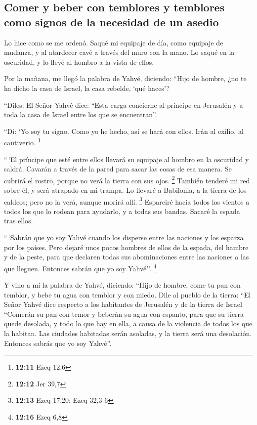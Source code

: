 \begin{paracol}{2}
\hypertarget{comer-y-beber-con-temblores-y-temblores-como-signos-de-la-necesidad-de-un-asedio}{%
\subsection{Comer y beber con temblores y temblores como signos de la
necesidad de un
asedio}\label{comer-y-beber-con-temblores-y-temblores-como-signos-de-la-necesidad-de-un-asedio}}

 Lo hice como se me ordenó. Saqué mi equipaje de día, como
equipaje de mudanza, y al atardecer cavé a través del muro con la mano.
Lo saqué en la oscuridad, y lo llevé al hombro a la vista de ellos.

 Por la mañana, me llegó la palabra de Yahvé, diciendo:
 ``Hijo de hombre, ¿no te ha dicho la casa de Israel, la
casa rebelde, `qué haces'?

 ``Diles: El Señor Yahvé dice: ``Esta carga concierne al
príncipe en Jerusalén y a toda la casa de Israel entre los que se
encuentran''.

 ``Di: `Yo soy tu signo. Como yo he hecho, así se hará
con ellos. Irán al exilio, al cautiverio. \footnote{\textbf{12:11} Ezeq
  12,6}

 ``\,`El príncipe que esté entre ellos llevará su
equipaje al hombro en la oscuridad y saldrá. Cavarán a través de la
pared para sacar las cosas de esa manera. Se cubrirá el rostro, porque
no verá la tierra con sus ojos. \footnote{\textbf{12:12} Jer 39,7}
 También tenderé mi red sobre él, y será atrapado en mi
trampa. Lo llevaré a Babilonia, a la tierra de los caldeos; pero no la
verá, aunque morirá allí. \footnote{\textbf{12:13} Ezeq 17,20; Ezeq
  32,3-6}  Esparciré hacia todos los vientos a todos los
que lo rodean para ayudarlo, y a todas sus bandas. Sacaré la espada tras
ellos.

 ``\,`Sabrán que yo soy Yahvé cuando los disperse entre
las naciones y los esparza por los países.  Pero dejaré
unos pocos hombres de ellos de la espada, del hambre y de la peste, para
que declaren todas sus abominaciones entre las naciones a las que
lleguen. Entonces sabrán que yo soy Yahvé''. \footnote{\textbf{12:16}
  Ezeq 6,8}

 Y vino a mí la palabra de Yahvé, diciendo:
 ``Hijo de hombre, come tu pan con temblor, y bebe tu
agua con temblor y con miedo.  Dile al pueblo de la
tierra: ``El Señor Yahvé dice respecto a los habitantes de Jerusalén y
de la tierra de Israel ``Comerán su pan con temor y beberán su agua con
espanto, para que su tierra quede desolada, y todo lo que hay en ella, a
causa de la violencia de todos los que la habitan.  Las
ciudades habitadas serán asoladas, y la tierra será una desolación.
Entonces sabrás que yo soy Yahvé''.


\end{paracol}
